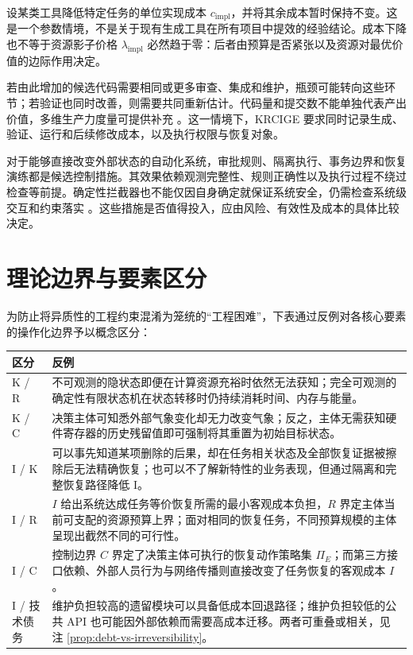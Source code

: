 \documentclass[11pt,a4paper]{ctexart}
\numberwithin{equation}{section}
\theoremstyle{definition}
\theoremstyle{plain}
\begin{document}
设某类工具降低特定任务的单位实现成本 $c_{\mathrm{impl}}$，并将其余成本暂时保持不变。这是一个参数情境，不是关于现有生成工具在所有项目中提效的经验结论。成本下降也不等于资源影子价格 $\lambda_{\mathrm{impl}}$ 必然趋于零：后者由预算是否紧张以及资源对最优价值的边际作用决定。

若由此增加的候选代码需要相同或更多审查、集成和维护，瓶颈可能转向这些环节；若验证也同时改善，则需要共同重新估计。代码量和提交数不能单独代表产出价值，多维生产力度量可提供补充 \cite{forsgren2021}。这一情境下，KRCIGE 要求同时记录生成、验证、运行和后续修改成本，以及执行权限与恢复对象。

对于能够直接改变外部状态的自动化系统，审批规则、隔离执行、事务边界和恢复演练都是候选控制措施。其效果依赖观测完整性、规则正确性以及执行过程不绕过检查等前提。确定性拦截器也不能仅因自身确定就保证系统安全，仍需检查系统级交互和约束落实 \cite{leveson2004}。这些措施是否值得投入，应由风险、有效性及成本的具体比较决定。

\section{理论边界与要素区分}
\label{sec:independence}

为防止将异质性的工程约束混淆为笼统的“工程困难”，下表通过反例对各核心要素的操作化边界予以概念区分：

\begin{center}
\begin{tabularx}{\textwidth}{>{\raggedright\arraybackslash}p{}X}
\toprule
\textbf{区分} & \textbf{反例}\\
\midrule
K / R & 不可观测的隐状态即便在计算资源充裕时依然无法获知；完全可观测的确定性有限状态机在状态转移时仍持续消耗时间、内存与能量。\\
K / C & 决策主体可知悉外部气象变化却无力改变气象；反之，主体无需获知硬件寄存器的历史残留值即可强制将其重置为初始目标状态。\\

I / K & 可以事先知道某项删除的后果，却在任务相关状态及全部恢复证据被擦除后无法精确恢复；也可以不了解新特性的业务表现，但通过隔离和完整恢复路径降低 I。\\
I / R & $I$ 给出系统达成任务等价恢复所需的最小客观成本负担，$R$ 界定主体当前可支配的资源预算上界；面对相同的恢复任务，不同预算规模的主体呈现出截然不同的可行性。\\
I / C & 控制边界 $C$ 界定了决策主体可执行的恢复动作策略集 $\Pi_E$；而第三方接口依赖、外部人员行为与网络传播则直接改变了任务恢复的客观成本 $I$。\\
I / 技术债务 & 维护负担较高的遗留模块可以具备低成本回退路径；维护负担较低的公共 API 也可能因外部依赖而需要高成本迁移。两者可重叠或相关，见注 \ref{prop:debt-vs-irreversibility}。\\
\bottomrule
\end{tabularx}
\end{center}
\end{document}

